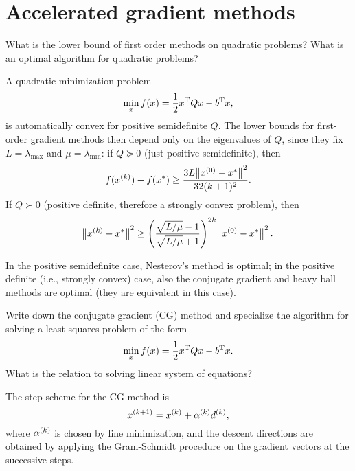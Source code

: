 \documentclass{article}
\begin{document}
\section{Accelerated gradient methods}

\begin{question}
  What is the lower bound of first order methods on quadratic problems?  What is an optimal
  algorithm for quadratic problems?
\end{question}

A quadratic minimization problem
\begin{equation*}
  \min_x f(x) = \frac{1}{2} \T{x} Q x - \T{b}x,
\end{equation*}
is automatically convex for positive semidefinite \(Q\).  The lower bounds for first-order gradient
methods then depend only on the eigenvalues of \(Q\), since they fix \(L = \lambda_{\text{max}}\)
and \(\mu = \lambda_{\text{min}}\): if \(Q \succeq 0\) (just positive semidefinite), then
\begin{equation*}
  f(\kth{x}) - f(x^*) \geq \frac{3L \enVert[1]{\kth[0]{x} - x^*}^2}{32(k+1)^2}.
\end{equation*}
If \(Q \succ 0\) (positive definite, therefore a strongly convex problem), then
\begin{equation*}
  \enVert[1]{\kth{x} - x^*}^2
  \geq \left( \frac{\sqrt{L/\mu} - 1}{\sqrt{L/\mu} + 1} \right)^{2k} \enVert[1]{\kth[0]{x} - x^*}^2.
\end{equation*}

In the positive semidefinite case, Nesterov's method is optimal; in the positive definite (i.e.,
strongly convex) case, also the conjugate gradient and heavy ball methods are optimal (they are
equivalent in this case).

\begin{question}
  Write down the conjugate gradient (CG) method and specialize the algorithm for solving a
  least-squares problem of the form
  \[
    \min_x f(x) = \frac{1}{2} \T{x} Q x - \T{b} x.
  \]
  What is the relation to solving linear system of equations?
\end{question}

The step scheme for the CG method is
\begin{equation*}
  \kth[k+1]{x} = \kth{x} + \kth{\alpha}\kth{d},
\end{equation*}
where \(\kth{\alpha}\) is chosen by line minimization, and the descent directions are obtained by
applying the Gram-Schmidt procedure on the gradient vectors at the successive steps.
\end{document}
